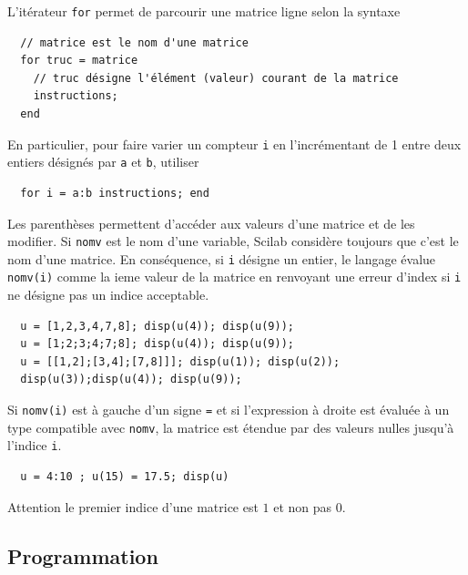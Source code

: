 L'itérateur \texttt{for} permet de parcourir une matrice ligne selon la syntaxe
\begin{verbatim}
  // matrice est le nom d'une matrice
  for truc = matrice
    // truc désigne l'élément (valeur) courant de la matrice 
    instructions;
  end
\end{verbatim}
En particulier, pour faire varier un compteur \texttt{i} en l'incrémentant de 1 entre deux entiers désignés par \texttt{a} et \texttt{b}, utiliser 
\begin{verbatim}
  for i = a:b instructions; end
\end{verbatim}
Les parenthèses permettent d'accéder aux valeurs d'une matrice et de les modifier. Si \texttt{nomv} est le nom d'une variable, Scilab considère toujours que c'est le nom d'une matrice. En conséquence, si \texttt{i} désigne un entier, le langage évalue \texttt{nomv(i)} comme la ieme valeur de la matrice en renvoyant une erreur d'index si \texttt{i} ne désigne pas un indice acceptable.
\begin{verbatim}
  u = [1,2,3,4,7,8]; disp(u(4)); disp(u(9));  
  u = [1;2;3;4;7;8]; disp(u(4)); disp(u(9)); 
  u = [[1,2];[3,4];[7,8]]]; disp(u(1)); disp(u(2));
  disp(u(3));disp(u(4)); disp(u(9));  
\end{verbatim}
Si \texttt{nomv(i)} est à gauche d'un signe \texttt{=} et si l'expression à droite est évaluée à un type compatible avec \texttt{nomv}, la matrice est étendue par des valeurs nulles jusqu'à l'indice \texttt{i}.
\begin{verbatim}
  u = 4:10 ; u(15) = 17.5; disp(u)
\end{verbatim}
Attention le premier indice d'une matrice est $1$ et non pas $0$.

\subsection{Programmation}
